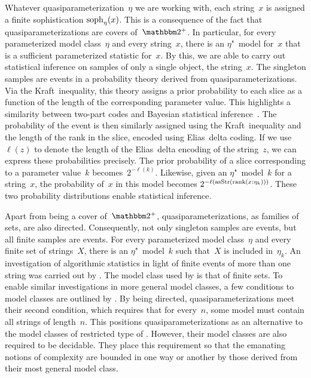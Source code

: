 Whatever quasiparameterization~$\eta$ we are working with, each string~$x$ is assigned a finite sophistication $\operatorname{soph}_\eta(x)$.
This is a consequence of the fact that quasiparameterizations are covers of~$\binary^+$.
In particular, for every parameterized model class~$\eta$ and every string~$x$, there is an $\eta$"~model for~$x$ that is a sufficient parameterized statistic for~$x$.
By this, we are able to carry out statistical inference on samples of only a single object, the string~$x$.
The singleton samples are events in a probability theory derived from quasiparameterizations.
Via the Kraft~inequality, this theory assigns a prior probability to each slice as a function of the length of the corresponding parameter value.
This highlights a similarity between two-part codes and Bayesian statistical inference~\parencite{grunwald2007minimum}.
The probability of the event is then similarly assigned using the Kraft~inequality and the length of the rank in the slice, encoded using Elias~delta coding.
If we use $\ell(z)$ to denote the length of the Elias~delta encoding of the string~$z$, we can express these probabilities precisely.
The prior probability of a slice corresponding to a parameter value~$k$ becomes~$2^{-\ell(k)}$.
Likewise, given an $\eta$"~model~$k$ for a string~$x$, the probability of~$x$ in this model becomes $2^{-\ell(\operatorname{asStr}(\operatorname{rank}(x : \eta_k)))}$.
These two probability distributions enable statistical inference.

Apart from being a cover of~$\binary^+$, quasiparameterizations, as families of sets, are also directed.
Consequently, not only singleton samples are events, but all finite samples are events.
For every parameterized model class~$\eta$ and every finite set of strings~$X$, there is an $\eta$"~model~$k$ such that~$X$ is included in~$\eta_k$.
An investigation of algorithmic statistics in light of finite events of more than one string was carried out by \textcite{milovanov2016algorithmic}.
The model class used by \citeauthor{milovanov2016algorithmic} is that of finite sets.
To enable similar investigations in more general model classes, a few conditions to model classes are outlined by \textcite[Section~6.1]{vereshchagin2017algorithmic}.
By being directed, quasiparameterizations meet their second condition, which requires that for every~$n$, some model must contain all strings of length~$n$.
This positions quasiparameterizations as an alternative to the model classes of restricted type of \textcite{vereshchagin2017algorithmic}.
However, their model classes are also required to be decidable.
They place this requirement so that the emanating notions of complexity are bounded in one way or another by those derived from their most general model class.

